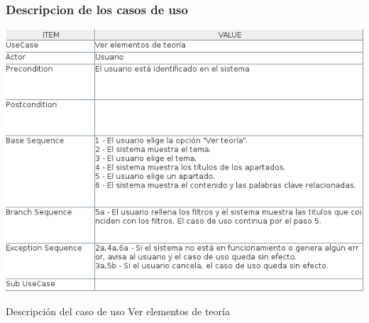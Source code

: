 \documentclass[openright,twoside,10pt]{book}
\begin{document}
    \newpage
    
    \subsubsection{Descripcion de los casos de
    uso}\label{descripcion-de-los-casos-de-uso}
    
    \vspace*{\fill}
    
    \begin{table}[H]
        \begin{center}
            \includegraphics[width=\textwidth]{img/astah/analisis/casos_de_uso/useCase01.png}
        \end{center}
        \caption{Descripción del caso de uso Ver elementos de teoría}
    \end{table}
    
    \vspace*{\fill}
    
    \newpage
    
    \vspace*{\fill}
    
\end{document}
